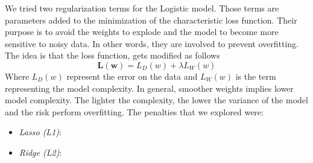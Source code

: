 We tried two regularization terms for the Logistic model.
Those terms are parameters added to the minimization of the characteristic loss function. Their purpose is to avoid the weights to explode and the model to become more sensitive to noisy data. In other words, they are involved to prevent overfitting.
The idea is that the loss function, gets modified as follows
\[ \mathbf{L(w)} = L_{D}(w) + \lambda L_{W}(w)\]
Where $ L_{D}(w)  $ represent the error on the data and $ L_{W}(w)  $ is the term representing the model complexity. In general, smoother weights implies lower model complexity. The lighter the complexity, the lower the variance of the model and the risk perform overfitting.
The penalties that we explored were:
\begin{itemize}
	\item[\PencilRight] \textit{Lasso (L1)}:
	\item[\PencilRight] \textit{Ridge (L2)}:
\end{itemize}
